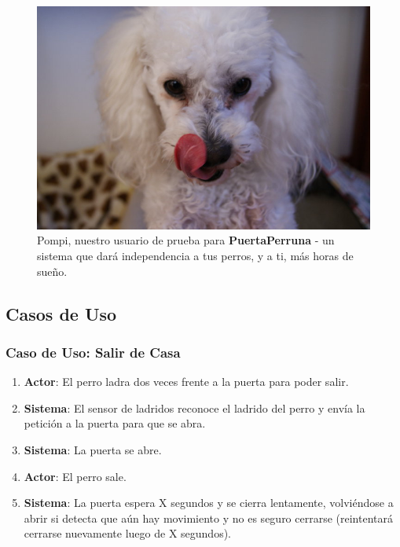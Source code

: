 \begin{figure}[!h]
\centering
\includegraphics[scale=3]{Pictures/pompi.jpg}
\caption{Pompi, nuestro usuario de prueba para \textbf{PuertaPerruna} - un sistema que dará independencia a tus perros, y a ti, más horas de sueño.}
\label{fig:pompi}
\end{figure}

\subsection{Casos de Uso}
\subsubsection{Caso de Uso: Salir de Casa}
\begin{enumerate}
    \item \textbf{Actor}: El perro ladra dos veces frente a la puerta para poder salir.
    \item \textbf{Sistema}: El sensor de ladridos reconoce el ladrido del perro y envía la petición a la puerta para que se abra.
    \item \textbf{Sistema}: La puerta se abre.
    \item \textbf{Actor}: El perro sale.
    \item \textbf{Sistema}: La puerta espera X segundos y se cierra lentamente, volviéndose a abrir si detecta que aún hay movimiento y no es seguro cerrarse (reintentará cerrarse nuevamente luego de X segundos).
\end{enumerate}


